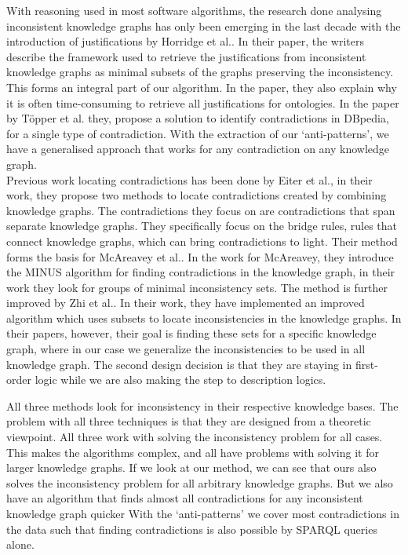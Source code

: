 \documentclass[11pt,letterpaper ,oneside ]{book}
\begin{document}
	With reasoning used in most software algorithms, the research done analysing inconsistent knowledge graphs has only been emerging in the last decade with the introduction of justifications by Horridge et al.\cite{Horridge:2009}. In their paper, the writers describe the framework used to retrieve the justifications from inconsistent knowledge graphs as minimal subsets of the graphs preserving the inconsistency. This forms an integral part of our algorithm. In the paper, they also explain why it is often time-consuming to retrieve all justifications for ontologies. In the paper by T\"{o}pper et al.\cite{Topper:2012} they, propose a solution to identify contradictions in DBpedia, for a single type of contradiction. With the extraction of our `anti-patterns', we have a generalised approach that works for any contradiction on any knowledge graph. \\
	
	Previous work locating contradictions has been done by Eiter et al.\cite{Eiter:2010}, in their work, they propose two methods to locate contradictions created by combining knowledge graphs. The contradictions they focus on are contradictions that span separate knowledge graphs. They specifically focus on the bridge rules, rules that connect knowledge graphs, which can bring contradictions to light. Their method forms the basis for McAreavey et al.\cite{McAreavey:2014}. In the work for McAreavey, they introduce the MINUS algorithm for finding contradictions in the knowledge graph, in their work they look for groups of minimal inconsistency sets. The method is further improved by Zhi et al.\cite{Zhi:2015}. In their work, they have implemented an improved algorithm which uses subsets to locate inconsistencies in the knowledge graphs. In their papers, however, their goal is finding these sets for a specific knowledge graph, where in our case we generalize the inconsistencies to be used in all knowledge graph. The second design decision is that they are staying in first-order logic while we are also making the step to description logics.
	
	All three methods look for inconsistency in their respective knowledge bases. The problem with all three techniques is that they are designed from a theoretic viewpoint. All three work with solving the inconsistency problem for all cases. This makes the algorithms complex, and all have problems with solving it for larger knowledge graphs. If we look at our method, we can see that ours also solves the inconsistency problem for all arbitrary knowledge graphs. But we also have an algorithm that finds almost all contradictions for any inconsistent knowledge graph quicker With the `anti-patterns' we cover most contradictions in the data such that finding contradictions is also possible by SPARQL queries alone.
	
\end{document}
